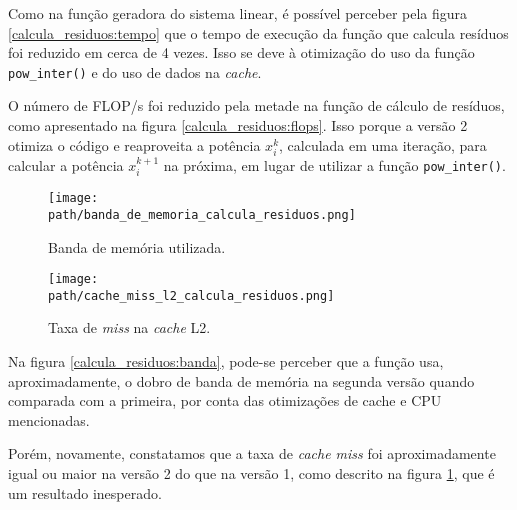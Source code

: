 \documentclass[a4paper, 11pt]{article}
\begin{document}
Como na função geradora do sistema linear, é possível perceber pela figura
\ref{calcula_residuos:tempo} que o tempo de execução da função que calcula
resíduos foi reduzido em cerca de 4 vezes. Isso se deve à otimização do uso
da função \texttt{pow\_inter()} e do uso de dados na \textit{cache}.

O número de FLOP/s foi reduzido pela metade na função de cálculo de resíduos,
como apresentado na figura \ref{calcula_residuos:flops}. Isso porque a versão
2 otimiza o código e reaproveita a potência $x_i^k$, calculada em uma iteração,
para calcular a potência $x_i^{k+1}$ na próxima, em lugar de utilizar a função
\texttt{pow\_inter()}.

\begin{figure}[H]
    \centering
    \begin{minipage}{.5\textwidth}
        \centering
        \texttt{[image: \\path/banda\_de\_memoria\_calcula\_residuos.png]}
        \caption{Banda de memória utilizada.}
        \label{calcula_residuos:banda}
    \end{minipage}\hfill
    \begin{minipage}{.5\textwidth}
        \centering
        \texttt{[image: \\path/cache\_miss\_l2\_calcula\_residuos.png]}
        \caption{Taxa de \textit{miss} na \textit{cache} L2.}
        \label{calcula_residuos:cache_miss}
    \end{minipage}
\end{figure}

Na figura \ref{calcula_residuos:banda}, pode-se perceber que a função usa,
aproximadamente, o dobro de banda de memória na segunda versão quando comparada
com a primeira, por conta das otimizações de cache e CPU mencionadas.

Porém, novamente, constatamos que a taxa de \textit{cache miss} foi aproximadamente
igual ou maior na versão 2 do que na versão 1, como descrito na figura
\ref{calcula_residuos:cache_miss}, que é um resultado inesperado.
\end{document}
